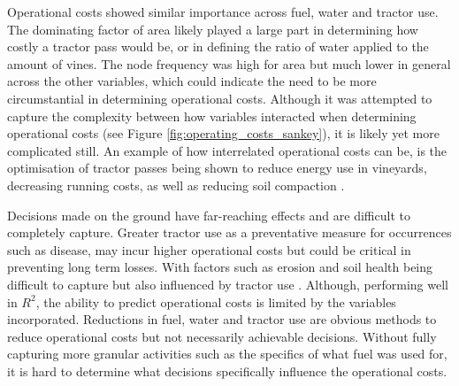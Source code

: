 \documentclass[review,12pt,authoryear]{elsarticle}
\begin{document}
\begin{linenumbers}
\par
Operational costs showed similar importance across fuel, water and tractor use. The dominating factor of area likely played a large part in determining how costly a tractor pass would be, or in defining the ratio of water applied to the amount of vines. The node frequency was high for area but much lower in general across the other variables, which could indicate the need to be more circumstantial in determining operational costs. Although it was attempted to capture the complexity between how variables interacted when determining operational costs (see Figure \ref{fig:operating_costs_sankey}), it is likely yet more complicated still. An example of how interrelated operational costs can be, is the optimisation of tractor passes being shown to reduce energy use in vineyards, decreasing running costs, as well as reducing soil compaction \citep{capelloEffectsTractorPasses2019}. 
\par
Decisions made on the ground have far-reaching effects and are difficult to completely capture. Greater tractor use as a preventative measure for occurrences such as disease, may incur higher operational costs but could be critical in preventing long term losses. With factors such as erosion and soil health being difficult to capture but also influenced by tractor use \citep{capelloEffectsTractorPasses2019,capelloPermanentCoverSoil2020}. Although, performing well in $R^2$, the ability to predict operational costs is limited by the variables incorporated. Reductions in fuel, water and tractor use are obvious methods to reduce operational costs but not necessarily achievable decisions. Without fully capturing more granular activities such as the specifics of what fuel was used for, it is hard to determine what decisions specifically influence the operational costs.
\par

\end{linenumbers}
\end{document}
